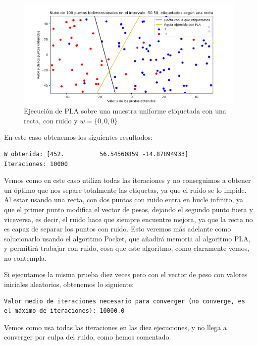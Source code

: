 \documentclass[12pt, spanish]{article}
\begin{document}
\begin{figure}[H]
  \centering
      \includegraphics[scale = 0.70]{ej-2-PLA-ruido.png}
 		 \caption{Ejecución de PLA sobre una muestra uniforme etiquetada con una recta, con ruido y $w = \{0, 0, 0\}$}
  		\label{fig:ej2-PLA}

\end{figure}

En este caso obtenemos los siguientes resultados:

\begin{lstlisting}
W obtenida: [452.          56.54560859 -14.87894933]
Iteraciones: 10000
\end{lstlisting}

Vemos como en este caso utiliza todas las iteraciones y no conseguimos a obtener un óptimo que nos separe totalmente las etiquetas, ya que el ruido se lo impide. Al estar usando una recta, con dos puntos con ruido entra en bucle infinito, ya que el primer punto modifica el vector de pesos, dejando el segundo punto fuera y viceversa, es decir, el ruido hace que siempre encuentre mejora, ya que la recta no es capaz de separar los puntos con ruido. Esto veremos más adelante como solucionarlo usando el algoritmo Pocket, que añadirá memoria al algoritmo PLA, y permitirá trabajar con ruido, cosa que este algoritmo, como claramente vemos, no contempla.


Si ejecutamos la misma prueba diez veces pero con el vector de peso con valores iniciales aleatorios, obtenemos lo siguiente:

\begin{lstlisting}
Valor medio de iteraciones necesario para converger (no converge, es el máximo de iteraciones): 10000.0
\end{lstlisting}

Vemos como usa todas las iteraciones en las diez ejecuciones, y no llega a converger por culpa del ruido, como hemos comentado.
\end{document}
